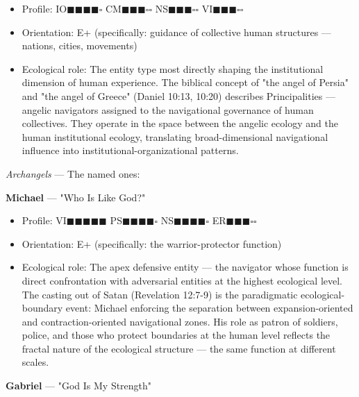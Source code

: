 \begin{itemize}[nosep,leftmargin=*]
  \item Profile: IO$\blacksquare$$\blacksquare$$\blacksquare$$\blacksquare$$\square$ CM$\blacksquare$$\blacksquare$$\blacksquare$$\square$$\square$ NS$\blacksquare$$\blacksquare$$\blacksquare$$\square$$\square$ VI$\blacksquare$$\blacksquare$$\blacksquare$$\square$$\square$
  \item Orientation: E+ (specifically: guidance of collective human structures — nations, cities, movements)
  \item Ecological role: The entity type most directly shaping the institutional dimension of human experience. The biblical concept of "the angel of Persia" and "the angel of Greece" (Daniel 10:13, 10:20) describes Principalities — angelic navigators assigned to the navigational governance of human collectives. They operate in the space between the angelic ecology and the human institutional ecology, translating broad-dimensional navigational influence into institutional-organizational patterns.
\end{itemize}


\textit{Archangels} — The named ones:


\textbf{Michael} — "Who Is Like God?"

\begin{itemize}[nosep,leftmargin=*]
  \item Profile: VI$\blacksquare$$\blacksquare$$\blacksquare$$\blacksquare$$\blacksquare$ PS$\blacksquare$$\blacksquare$$\blacksquare$$\blacksquare$$\square$ NS$\blacksquare$$\blacksquare$$\blacksquare$$\blacksquare$$\square$ ER$\blacksquare$$\blacksquare$$\blacksquare$$\square$$\square$
  \item Orientation: E+ (specifically: the warrior-protector function)
  \item Ecological role: The apex defensive entity — the navigator whose function is direct confrontation with adversarial entities at the highest ecological level. The casting out of Satan (Revelation 12:7-9) is the paradigmatic ecological-boundary event: Michael enforcing the separation between expansion-oriented and contraction-oriented navigational zones. His role as patron of soldiers, police, and those who protect boundaries at the human level reflects the fractal nature of the ecological structure — the same function at different scales.
\end{itemize}


\textbf{Gabriel} — "God Is My Strength"

